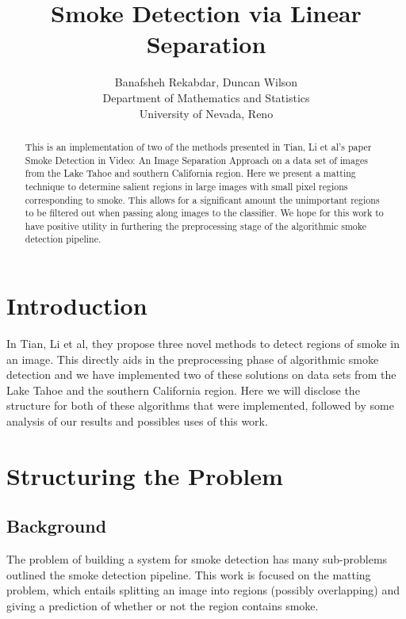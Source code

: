 \documentclass[12pt]{article}
\begin{document}
\nocite{*}


\title{Smoke Detection via Linear Separation}

\author{Banafsheh Rekabdar, Duncan Wilson \\ 
Department of Mathematics and Statistics \\
University of Nevada, Reno}

\maketitle

\begin{abstract}
  This is an implementation of two of the methods presented in Tian, Li et al's paper Smoke Detection in Video: An Image Separation Approach\cite{pap1} on a data set of images from the Lake Tahoe and southern California region. Here we present a matting technique to determine salient regions in large images with small pixel regions corresponding to smoke. This allows for a significant amount the unimportant regions to be filtered out when passing along images to the classifier. We hope for this work to have positive utility in furthering the preprocessing stage of the algorithmic smoke detection pipeline.
\end{abstract}

\newpage
\section{Introduction}

In Tian, Li et al, they propose three novel methods to detect regions of smoke in an image. This directly aids in the preprocessing phase of algorithmic smoke detection and we have implemented two of these solutions on data sets from the Lake Tahoe and the southern California region. Here we will disclose the structure for both of these algorithms that were implemented, followed by some analysis of our results and possibles uses of this work. 

\section{Structuring the Problem}
\label{sect:basics}

\subsection{Background}

The problem of building a system for smoke detection has many sub-problems outlined the smoke detection pipeline. This work is focused on the matting problem, which entails splitting an image into regions (possibly  overlapping) and giving a prediction of whether or not the region contains smoke.
\end{document}
